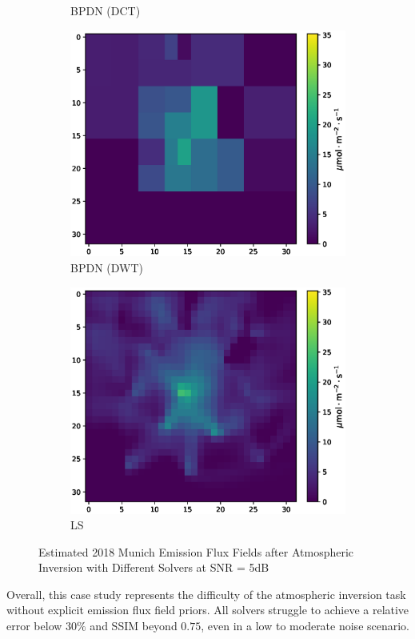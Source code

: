 \begin{figure}[htb]
\begin{minipage}[b]{\textwidth}
\begin{subfigure}[b]{0.32\textwidth}
            \caption{BPDN (DCT)}
        \end{subfigure}    
        \begin{subfigure}[b]{0.32\textwidth}
            \includegraphics[width=\textwidth]{figures/06_results/gaussian_plume_example/munich/bp_dwt_snr_5_db.eps}
            \caption{BPDN (DWT)}
        \end{subfigure}
        \begin{subfigure}[b]{0.32\textwidth}
            \includegraphics[width=\textwidth]{figures/06_results/gaussian_plume_example/munich/least_squares_snr_5_db.eps}
            \caption{LS}
        \end{subfigure}
        \caption{Estimated 2018 Munich Emission Flux Fields after Atmospheric Inversion with Different Solvers at SNR = 5dB}
        \label{fig:example_munich_5_dB}
    \end{minipage}
\end{figure}

Overall, this case study represents the difficulty of the atmospheric inversion task without explicit emission flux field priors.
All solvers struggle to achieve a relative error below $30\%$ and \gls{SSIM} beyond $0.75$, even in a low to moderate noise scenario.
